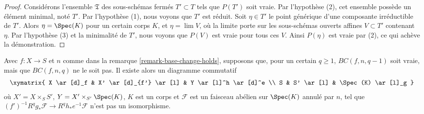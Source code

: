 \begin{proof}
Considérons l'ensemble $\mathfrak T$ des sous-schémas fermés $T' \subset T$
tels que $P(T')$ soit vraie. Par l'hypothèse (2), cet ensemble possède un élément minimal,
noté $T'$. Par l'hypothèse (1), nous voyons que $T'$ est réduit.
Soit $\eta \in T'$ le point générique d'une composante
irréductible de $T'$. Alors $\eta = \Spec(K)$ pour un certain corps
$K$, et $\eta = \lim V$, où la limite porte sur les sous-schémas
ouverts affines $V \subset T'$ contenant $\eta$.
Par l'hypothèse (3) et la minimalité de $T'$, nous voyons
que $P(V)$ est vraie pour tous ces $V$. Ainsi $P(\eta)$ est vraie
par (2), ce qui achève la démonstration.
\end{proof}

\begin{lemma}
\label{lemma-base-change-does-not-hold-pre}
Avec $f : X \to S$ et $n$ comme dans la remarque \ref{remark-base-change-holds},
supposons que, pour un certain $q \geq 1$, $BC(f, n, q - 1)$ soit vraie, mais que
$BC(f, n, q)$ ne le soit pas. Il existe alors un diagramme commutatif
$$
\xymatrix{
X \ar[d]_f & X' \ar[d]_{f'} \ar[l] & Y \ar[l]^h \ar[d]^e \\
S & S' \ar[l] & \Spec(K) \ar[l]_g
}
$$
où $X' = X \times_S S'$, $Y = X' \times_{S'} \Spec(K)$,
$K$ est un corps et $\mathcal{F}$ est un faisceau abélien
sur $\Spec(K)$ annulé par $n$, tel que
$(f')^{-1}R^qg_*\mathcal{F} \to R^qh_*e^{-1}\mathcal{F}$
n'est pas un isomorphisme.
\end{lemma}

